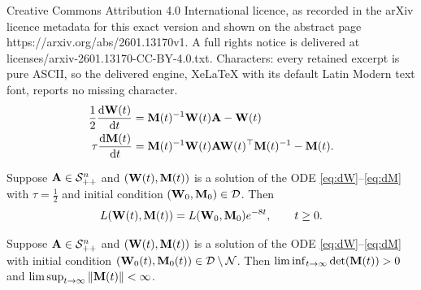 \documentclass[10pt,a4paper]{amsart}
\newcommand{\A}{{\bf A}}
\newcommand{\M}{{\bf M}}
\newcommand{\W}{{\bf W}}
\newcommand{\calD}{\mathcal{D}}
\newcommand{\calN}{\mathcal{N}}
\newcommand{\calS}{\mathcal{S}}
\newcommand{\dd}{\operatorname{d}\!}
\begin{document}
Creative Commons Attribution 4.0 International licence, as recorded in the arXiv licence metadata for this exact version and shown on the abstract page https://arxiv.org/abs/2601.13170v1. A full rights notice is delivered at licenses/arxiv-2601.13170-CC-BY-4.0.txt. Characters: every retained excerpt is pure ASCII, so the delivered engine, XeLaTeX with its default Latin Modern text font, reports no missing character.
\begin{align}
    \label{eq:dW}
    \frac12\frac{\dd \W(t)}{\dd t}&=\M(t)^{-1}\W(t) \A -\W(t)\\
    \label{eq:dM}
    \tau\frac{\dd \M(t)}{\dd t}&=\M(t)^{-1}\W(t) \A \W(t)^\top \M(t)^{-1}-\M(t).
\end{align}

\begin{lemma}\label{lem:WMconv}
Suppose $\A\in\calS_{++}^n$ and $(\W(t),\M(t))$ is a solution of the ODE \eqref{eq:dW}--\eqref{eq:dM} with $\tau=\frac12$ and initial condition $(\W_0,\M_0)\in\calD$. Then
\begin{align}\label{eq:Ldecay}
    L(\W(t),\M(t))=L(\W_0,\M_0)e^{-8t},\qquad t\ge0.
\end{align}
\end{lemma}

\begin{lemma}\label{lem:detM}
    Suppose $\A\in\calS_{++}^n$ and $(\W(t),\M(t))$ is a solution of the ODE \eqref{eq:dW}--\eqref{eq:dM} with initial condition
    $(\W_0(t),\M_0(t))\in\calD\setminus\calN$. Then $\liminf_{t\to\infty}\det(\M(t))>0$ and $\limsup_{t\to\infty}\|\M(t)\|<\infty$. 
\end{lemma}
\end{document}
